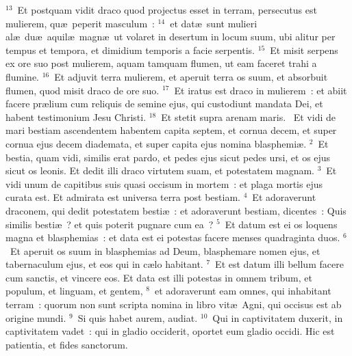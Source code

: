 ${}^{13}$~Et postquam vidit draco quod projectus esset in terram, persecutus est mulierem, qu\ae\ peperit masculum~:
${}^{14}$~et dat\ae\ sunt mulieri al\ae\ du\ae\ aquil\ae\ magn\ae\ ut volaret in desertum in locum suum, ubi alitur per tempus et tempora, et dimidium temporis a facie serpentis.
${}^{15}$~Et misit serpens ex ore suo post mulierem, aquam tamquam flumen, ut eam faceret trahi a flumine.
${}^{16}$~Et adjuvit terra mulierem, et aperuit terra os suum, et absorbuit flumen, quod misit draco de ore suo.
${}^{17}$~Et iratus est draco in mulierem~: et abiit facere pr\ae lium cum reliquis de semine ejus, qui custodiunt mandata Dei, et habent testimonium Jesu Christi.
${}^{18}$~Et stetit supra arenam maris.
~Et vidi de mari bestiam ascendentem habentem capita septem, et cornua decem, et super cornua ejus decem diademata, et super capita ejus nomina blasphemi\ae .
${}^{2}$~Et bestia, quam vidi, similis erat pardo, et pedes ejus sicut pedes ursi, et os ejus sicut os leonis. Et dedit illi draco virtutem suam, et potestatem magnam.
${}^{3}$~Et vidi unum de capitibus suis quasi occisum in mortem~: et plaga mortis ejus curata est. Et admirata est universa terra post bestiam.
${}^{4}$~Et adoraverunt draconem, qui dedit potestatem besti\ae~: et adoraverunt bestiam, dicentes~: Quis similis besti\ae~? et quis poterit pugnare cum ea~?
${}^{5}$~Et datum est ei os loquens magna et blasphemias~: et data est ei potestas facere menses quadraginta duos.
${}^{6}$~Et aperuit os suum in blasphemias ad Deum, blasphemare nomen ejus, et tabernaculum ejus, et eos qui in c\ae lo habitant.
${}^{7}$~Et est datum illi bellum facere cum sanctis, et vincere eos. Et data est illi potestas in omnem tribum, et populum, et linguam, et gentem,
${}^{8}$~et adoraverunt eam omnes, qui inhabitant terram~: quorum non sunt scripta nomina in libro vit\ae\ Agni, qui occisus est ab origine mundi.
${}^{9}$~Si quis habet aurem, audiat.
${}^{10}$~Qui in captivitatem duxerit, in captivitatem vadet~: qui in gladio occiderit, oportet eum gladio occidi. Hic est patientia, et fides sanctorum.


